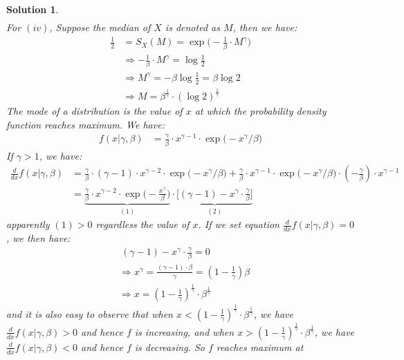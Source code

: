 \documentclass[11pt]{article}
\newtheorem{sol}{Solution}
\begin{document}
\begin{sol}
\begin{align*}
	\end{align*}
	For $(iv)$, \vskip 2mm
	Suppose the median of $X$ is denoted as $M$, then we have:
	\begin{align*}
		\frac{1}{2} &= S_X(M) = \exp\Big(-\frac{1}{\beta}\cdot M^{\gamma}\Big) \\
		&\Longrightarrow -\frac{1}{\beta}\cdot M^{\gamma} = \log\frac{1}{2}\\
		&\Longrightarrow M^{\gamma} = -\beta\log\frac{1}{2} = \beta\log 2\\
		&\Longrightarrow M = \beta^{\frac{1}{\gamma}}\cdot (\log 2)^{\frac{1}{\gamma}}
	\end{align*}
	The mode of a distribution is the value of $x$ at which the probability density function reaches maximum.\vskip 2mm
	We have:
	\begin{align*}
		f(x|\gamma, \beta) &= \frac{\gamma}{\beta}\cdot x^{\gamma - 1}\cdot \exp\Big(-x^{\gamma}/\beta\Big)
	\end{align*}
	If $\gamma >1$, we have:
	\begin{align*}
		\frac{d}{d x}f(x|\gamma, \beta) &= \frac{\gamma}{\beta}\cdot (\gamma - 1)\cdot x^{\gamma - 2}\cdot \exp\Big(-x^{\gamma}/\beta\Big) + \frac{\gamma}{\beta}\cdot x^{\gamma - 1}\cdot \exp\Big(-x^{\gamma}/\beta\Big)\cdot (-\frac{\gamma}{\beta})\cdot x^{\gamma - 1}\\
		&= \underbrace{\frac{\gamma}{\beta}\cdot x^{\gamma - 2}\cdot\exp\Big(-\frac{x^{\gamma}}{\beta}\Big)}_{(1)}\cdot  \underbrace{\Big[(\gamma - 1) - x^{\gamma}\cdot \frac{\gamma}{\beta}\Big]}_{(2)}
	\end{align*}
	apparently $(1) > 0$ regardless the value of $x$. If we set equation $\frac{d}{dx}f(x|\gamma, \beta) = 0$, we then have:
	\begin{align*}
		&\ (\gamma - 1) - x^{\gamma}\cdot \frac{\gamma}{\beta} = 0\\
		&\Longrightarrow x^{\gamma} = \frac{(\gamma - 1)\cdot \beta}{\gamma} = (1 - \frac{1}{\gamma})\beta\\
		&\Longrightarrow x = (1 - \frac{1}{\gamma})^{\frac{1}{\gamma}}\cdot \beta^{\frac{1}{\gamma}}
	\end{align*}
	and it is also easy to observe that when $x <(1 - \frac{1}{\gamma})^{\frac{1}{\gamma}}\cdot \beta^{\frac{1}{\gamma}} $, we have $\frac{d}{d x}f(x|\gamma, \beta) > 0$ and hence $f$ is increasing, and when $x > (1 - \frac{1}{\gamma})^{\frac{1}{\gamma}}\cdot \beta^{\frac{1}{\gamma}}$, we have $\frac{d}{d x}f(x|\gamma, \beta) < 0$ and hence $f$ is decreasing. So $f$ reaches maximum at 

\end{sol}
\end{document}
